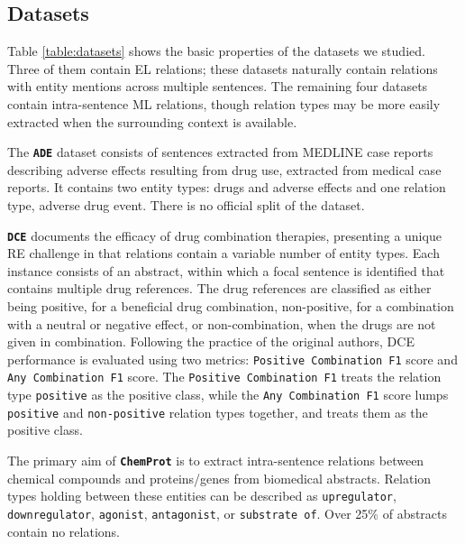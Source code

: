 \documentclass[11pt]{article}
\begin{document}
\vspace{-1mm}
\subsection{Datasets \label{subsec:datasets}}

Table \ref{table:datasets} shows the basic properties of the datasets we studied.  Three of them contain EL relations; these datasets naturally contain relations with entity mentions across multiple sentences.  The remaining four datasets contain intra-sentence ML relations, though relation types may be more easily extracted when the surrounding context is available. 

The \textbf{\texttt{ADE}} dataset \cite{gurulingappa2012development} consists of sentences extracted from MEDLINE case reports describing adverse effects resulting from drug use, extracted from medical case reports. It contains two entity types: drugs and adverse effects and one relation type, adverse drug event. There is no official split of the dataset.

\textbf{\texttt{DCE}} \cite{tiktinsky-etal-2022-dataset} documents the efficacy of drug combination therapies, presenting a unique RE challenge in that relations contain a variable number of entity types.  Each instance consists of an abstract, within which a focal sentence is identified that contains multiple drug references. The drug references are classified as either being positive, for a beneficial drug combination, non-positive, for a combination with a neutral or negative effect, or non-combination, when the drugs are not given in combination.  Following the practice of the original authors, DCE performance is evaluated using two metrics: \texttt{Positive Combination F1} score and \texttt{Any Combination F1} score. The \texttt{Positive Combination F1} treats the relation type \texttt{positive} as the positive class, while the \texttt{Any Combination F1} score lumps \texttt{positive} and \texttt{non-positive} relation types together, and treats them as the positive class.

The primary aim of \textbf{\texttt{ChemProt}} \cite{krallinger2017overview} is to extract intra-sentence relations between chemical compounds and proteins/genes from biomedical abstracts. Relation types holding between these entities can be described as \texttt{upregulator}, \texttt{downregulator}, \texttt{agonist}, \texttt{antagonist}, or \texttt{substrate of}.  Over 25\% of abstracts contain no relations.
\end{document}
